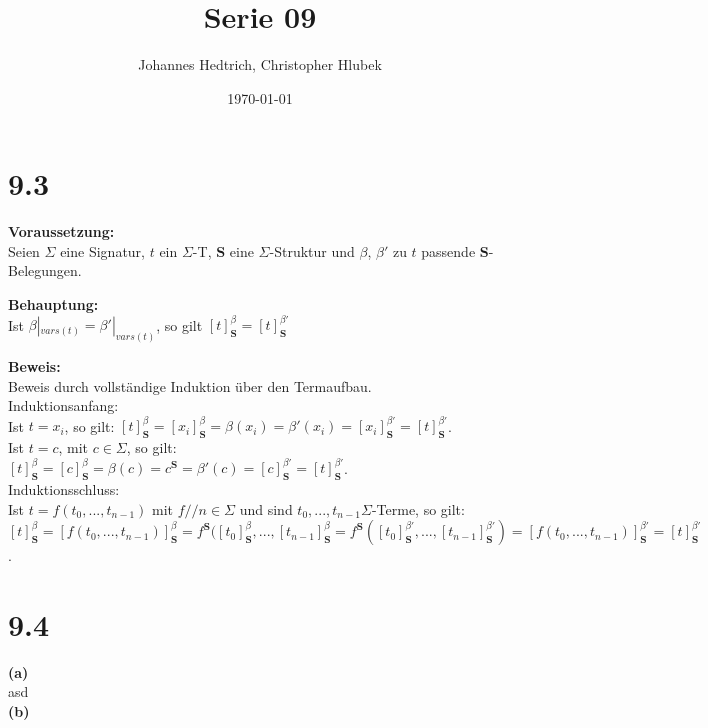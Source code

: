 \documentclass[12pt,a4paper]{scrartcl}
\title{Serie 09}
\author{Johannes Hedtrich, Christopher Hlubek}
\date{\today}
\begin{document}
  \section*{9.3}
  \noindent
  \textbf{Voraussetzung:}\\
  
  Seien $\Sigma$ eine Signatur, $t$ ein $\Sigma$-T, $\textbf{S}$ eine $\Sigma$-Struktur und $\beta$, $\beta'$ zu $t$ passende $\textbf{S}$-Belegungen.

  \noindent
  \textbf{Behauptung:}\\ 
  
  Ist $\beta|_{vars(t)} = \beta'|_{vars(t)}$, so gilt $[t]^{\beta}_{\textbf{S}} = [t]^{\beta'}_{\textbf{S}}$

  \noindent
  \textbf{Beweis:}\\
  
  Beweis durch vollständige Induktion über den Termaufbau.\\
  Induktionsanfang:\\
  Ist $t = x_i$, so gilt: $[t]^{\beta}_{\textbf{S}} = [x_i]^{\beta}_{\textbf{S}} = \beta(x_i) = \beta'(x_i) = [x_i]^{\beta'}_{\textbf{S}} = [t]^{\beta'}_{\textbf{S}}$.\\
  Ist $t = c$, mit $c \in \Sigma$, so gilt: $[t]^{\beta}_{\textbf{S}} = [c]^{\beta}_{\textbf{S}} = \beta(c) = c^{\textbf{S}}= \beta'(c) = [c]^{\beta'}_{\textbf{S}} = [t]^{\beta'}_{\textbf{S}}$.\\
  Induktionsschluss:\\
  Ist $t = f(t_0, ...,t_{n-1})$ mit $f // n \in \Sigma$ und sind $t_0, ..., t_{n-1} \Sigma$-Terme, so gilt:\\
  $[t]^{\beta}_{\textbf{S}} = [f(t_0, ...,t_{n-1})]^{\beta}_{\textbf{S}} = f^{\textbf{S}}([t_0]^{\beta}_{\textbf{S}}, ...,[t_{n-1}]^{\beta}_{\textbf{S}} = f^{\textbf{S}}([t_0]^{\beta'}_{\textbf{S}}, ...,[t_{n-1}]^{\beta'}_{\textbf{S}}) = [f(t_0, ...,t_{n-1})]^{\beta'}_{\textbf{S}} = [t]^{\beta'}_{\textbf{S}}$.\\
  \section*{9.4}
  \noindent
  \textbf{(a)}\\
  
  asd\\
  \textbf{(b)}\\
\end{document}
